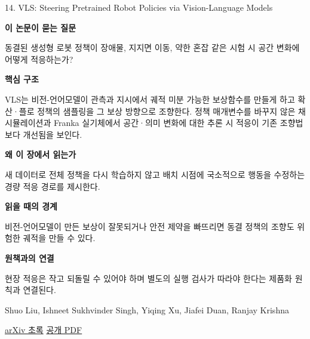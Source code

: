 \documentclass[11pt,openany]{book}
\begin{document}
\begin{termcard}{14. VLS: Steering Pretrained Robot Policies via Vision-Language Models}

\par

\medskip

{\sffamily\bfseries\color{deepblue} 이 논문이 묻는 질문}\par

동결된 생성형 로봇 정책이 장애물, 지지면 이동, 약한 혼잡 같은 시험 시 공간 변화에 어떻게 적응하는가?

\smallskip

{\sffamily\bfseries\color{deepblue} 핵심 구조}\par

VLS는 비전-언어모델이 관측과 지시에서 궤적 미분 가능한 보상함수를 만들게 하고 확산·플로 정책의 샘플링을 그 보상 방향으로 조향한다. 정책 매개변수를 바꾸지 않은 채 시뮬레이션과 Franka 실기체에서 공간·의미 변화에 대한 추론 시 적응이 기존 조향법보다 개선됨을 보인다.

\smallskip

{\sffamily\bfseries\color{deepblue} 왜 이 장에서 읽는가}\par

새 데이터로 전체 정책을 다시 학습하지 않고 배치 시점에 국소적으로 행동을 수정하는 경량 적응 경로를 제시한다.

\smallskip

{\sffamily\bfseries\color{coral} 읽을 때의 경계}\par

비전-언어모델이 만든 보상이 잘못되거나 안전 제약을 빠뜨리면 동결 정책의 조향도 위험한 궤적을 만들 수 있다.

\smallskip

{\sffamily\bfseries\color{teal} 원책과의 연결}\par

현장 적응은 작고 되돌릴 수 있어야 하며 별도의 실행 검사가 따라야 한다는 제품화 원칙과 연결된다.

\medskip

{\footnotesize\color{muted} Shuo Liu, Ishneet Sukhvinder Singh, Yiqing Xu, Jiafei Duan, Ranjay Krishna\par

\href{https://arxiv.org/abs/2602.03973}{arXiv 초록} \quad \href{https://arxiv.org/pdf/2602.03973}{공개 PDF}\par}

\end{termcard}
\end{document}
